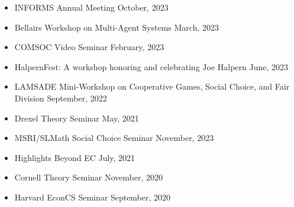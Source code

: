 \documentclass{article}
\begin{document}
    \begin{itemize}
    	\item INFORMS Annual Meeting \hfill October, 2023
    	\item Bellairs Workshop on Multi-Agent Systems \hfill March, 2023
    	\item COMSOC Video Seminar \hfill February, 2023
    \end{itemize}
    \begin{itemize}
    	\item HalpernFest: A workshop honoring and celebrating
Joe Halpern \hfill June, 2023
    	\item LAMSADE Mini-Workshop on Cooperative Games, Social Choice, and Fair Division \hfill September, 2022
    \end{itemize}
    
    \begin{itemize}
    	\item Drexel Theory Seminar \hfill May, 2021
    \end{itemize}
    
    \begin{itemize}
    	\item MSRI/SLMath Social Choice Seminar \hfill November, 2023
    	\item Highlights Beyond EC \hfill July, 2021
    	\item Cornell Theory Seminar \hfill November, 2020
    	\item Harvard EconCS Seminar \hfill September, 2020
    \end{itemize}
    
    
\end{document}
